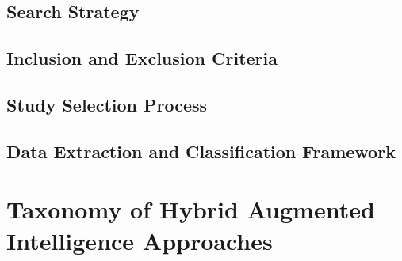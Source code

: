 \documentclass[preprint,12pt]{elsarticle}
\begin{document}
	\subsection{Search Strategy}
	
	\subsection{Inclusion and Exclusion Criteria}
	
	\subsection{Study Selection Process}
	
	\subsection{Data Extraction and Classification Framework}
	
	\section{Taxonomy of Hybrid Augmented Intelligence Approaches}
	
\end{document}
